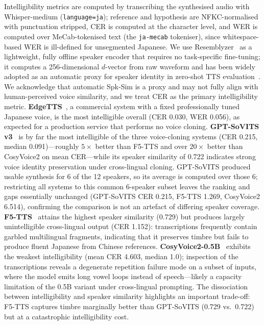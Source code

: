 \documentclass[journal]{IEEEtran}
\begin{document}
Intelligibility metrics are computed by transcribing the synthesised audio with Whisper-medium (\texttt{language=ja}); reference and hypothesis are NFKC-normalised with punctuation stripped, CER is computed at the character level, and WER is computed over MeCab-tokenised text (the \texttt{ja-mecab} tokeniser), since whitespace-based WER is ill-defined for unsegmented Japanese.
We use Resemblyzer~\cite{resemblyzer2020} as a lightweight, fully offline speaker encoder that requires no task-specific fine-tuning; it computes a 256-dimensional $d$-vector from raw waveform and has been widely adopted as an automatic proxy for speaker identity in zero-shot TTS evaluation~\cite{chen2024f5tts,cosyvoice2_2024}.
We acknowledge that automatic Spk-Sim is a proxy and may not fully align with human-perceived voice similarity, and we treat CER as the primary intelligibility metric.
\textbf{EdgeTTS}~\cite{edgetts2024}, a commercial system with a fixed professionally tuned Japanese voice, is the most intelligible overall (CER 0.030, WER 0.056), as expected for a production service that performs no voice cloning.
\textbf{GPT-SoVITS v3}~\cite{gptsovits2024} is by far the most intelligible of the three voice-cloning systems (CER 0.215, median 0.091)---roughly $5\times$ better than F5-TTS and over $20\times$ better than CosyVoice2 on mean CER---while its speaker similarity of 0.722 indicates strong voice identity preservation under cross-lingual cloning.
GPT-SoVITS produced usable synthesis for 6 of the 12 speakers, so its average is computed over those 6; restricting all systems to this common 6-speaker subset leaves the ranking and gaps essentially unchanged (GPT-SoVITS CER 0.215, F5-TTS 1.269, CosyVoice2 6.514), confirming the comparison is not an artefact of differing speaker coverage.
\textbf{F5-TTS}~\cite{chen2024f5tts} attains the highest speaker similarity (0.729) but produces largely unintelligible cross-lingual output (CER 1.152): transcriptions frequently contain garbled multilingual fragments, indicating that it preserves timbre but fails to produce fluent Japanese from Chinese references.
\textbf{CosyVoice2-0.5B}~\cite{cosyvoice2_2024} exhibits the weakest intelligibility (mean CER 4.603, median 1.0); inspection of the transcriptions reveals a degenerate repetition failure mode on a subset of inputs, where the model emits long vowel loops instead of speech---likely a capacity limitation of the 0.5B variant under cross-lingual prompting.
The dissociation between intelligibility and speaker similarity highlights an important trade-off: F5-TTS captures timbre marginally better than GPT-SoVITS (0.729 vs.\ 0.722) but at a catastrophic intelligibility cost.
\end{document}
